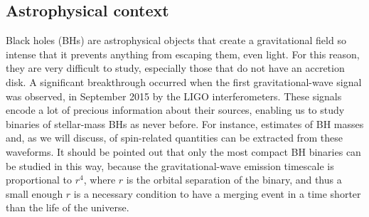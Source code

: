\subsection{Astrophysical context} \label{astrophysical_context}
Black holes (BHs) are astrophysical objects that create a gravitational field so intense that it prevents anything from escaping them, even light. For this reason, they are very difficult to study, especially those that do not have an accretion disk. A significant breakthrough occurred when the first gravitational-wave signal was observed, in September 2015 by the LIGO interferometers. These signals encode a lot of precious information about their sources, enabling us to study binaries of stellar-mass BHs as never before. For instance, estimates of BH masses and, as we will discuss, of spin-related quantities can be extracted from these waveforms. It should be pointed out that only the most compact BH binaries can be studied in this way, because the gravitational-wave emission timescale is proportional to $r^4$, where $r$ is the orbital separation of the binary, and thus a small enough $r$ is a necessary condition to have a merging event in a time shorter than the life of the universe.

\vspace{4mm}  


